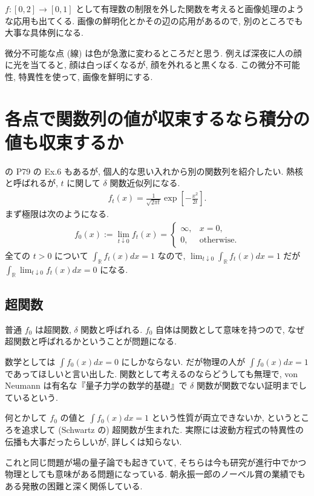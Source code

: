 \documentclass[openany, a4paper, oneside]{jsbook}
\theoremstyle{break}
\theoremstyle{breakdefn}
\begin{document}
$f \colon [0,2] \to [0,1]$ として有理数の制限を外した関数を考えると画像処理のような応用も出てくる.
画像の鮮明化とかその辺の応用があるので, 別のところでも大事な具体例になる.

微分不可能な点 (線) は色が急激に変わるところだと思う.
例えば深夜に人の顔に光を当てると, 顔は白っぽくなるが, 顔を外れると黒くなる.
この微分不可能性, 特異性を使って, 画像を鮮明にする.
\section{各点で関数列の値が収束するなら積分の値も収束するか}


\cite{GelbaumOlmsted1} の P79 の Ex.6 もあるが, 個人的な思い入れから別の関数列を紹介したい.
熱核と呼ばれるが, $t$ に関して $\delta$ 関数近似列になる.
\begin{align}
 f_t (x)
 =
 \frac{1}{\sqrt{2 \pi t}} \exp \left[ - \frac{x^2}{2t} \right].
\end{align}
まず極限は次のようになる.
\begin{align}
 f_0 (x)
 :=
 \lim_{t \downarrow 0} f_t (x)
 =
 \begin{cases}
  \infty, & x = 0, \\
  0,      & \mathrm{otherwise}.
 \end{cases}
\end{align}
全ての $t > 0$ について $\int_{\mathbb{R}} f_t (x) dx = 1$ なので,
$\lim_{t \downarrow 0} \int_{\mathbb{R}} f_t (x) dx = 1$ だが
$\int_{\mathbb{R}} \lim_{t \downarrow 0} f_t (x) dx = 0$ になる.
\subsection{超関数}


普通 $f_0$ は超関数, $\delta$ 関数と呼ばれる.
$f_0$ 自体は関数として意味を持つので, なぜ超関数と呼ばれるかということが問題になる.

数学としては $\int f_0 (x) dx = 0$ にしかならない.
だが物理の人が $\int f_0 (x) dx = 1$ であってほしいと言い出した.
関数として考えるのならどうしても無理で, von Neumann は有名な『量子力学の数学的基礎』で $\delta$ 関数が関数でない証明までしているという.

何とかして $f_0$ の値と $\int f_0 (x) dx = 1$ という性質が両立できないか, というところを追求して (Schwartz の) 超関数が生まれた.
実際には波動方程式の特異性の伝播も大事だったらしいが, 詳しくは知らない.

これと同じ問題が場の量子論でも起きていて, そちらは今も研究が進行中でかつ物理としても意味がある問題になっている.
朝永振一郎のノーベル賞の業績でもある発散の困難と深く関係している.
\end{document}
